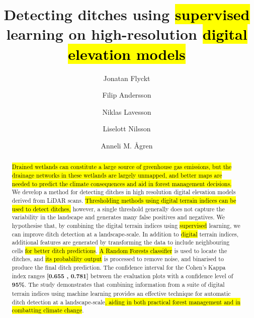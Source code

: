 \documentclass[11pt, review]{elsarticle} %
\begin{document}
\begin{frontmatter}
\title{Detecting ditches using \hl{supervised} learning on high-resolution \hl{digital elevation models}}

\author[ju]{Jonatan Flyckt}

\author[ju]{Filip Andersson}

\author[ju]{Niklas Lavesson}

\author[fa]{Liselott Nilsson}

\author[slu]{Anneli M. \AA gren}

\address[ju]{J\"onk\"oping Artificial Intelligence Laboratory, J\"onk\"oping University, Gjuterigatan 5, 551 11, J\"onk\"oping, Sweden}
\address[fa]{Forest Department, Swedish Forest Agency, Skeppargatan 17, 931 32 Skellefte\aa, Sweden}
\address[slu]{Department of Forest Ecology and Management, Swedish University of Agricultural Sciences, SLU, Skogsmarksgr\"and 17, 901 83, Ume\aa, Sweden}

\begin{abstract}
{\footnotesize
\hl{Drained wetlands can constitute a large source of greenhouse gas emissions, but the drainage networks in these wetlands are largely unmapped, and better maps are needed to predict the climate consequences and aid in forest management decisions.} We develop a method for detecting ditches in high resolution digital elevation models derived from LiDAR scans. \hl{Thresholding methods using digital terrain indices can be used to detect ditches,} however, a single threshold generally does not capture the variability in the landscape and generates many false positives and negatives. We hypothesise that, by combining the digital terrain indices using \hl{supervised} learning, we can improve ditch detection at a landscape-scale. In addition to \hl{digital} terrain indices, additional features are generated by transforming the data to include neighbouring cells \hl{for better ditch predictions}. \hl{A Random Forests classifier} is used to locate the ditches, and \hl{its probability output} is processed to remove noise, and binarised to produce the final ditch prediction. The confidence interval for the Cohen's Kappa index ranges \textbf{[0.655 , 0.781]} between the evaluation plots with a confidence level of \textbf{95\%}. The study demonstrates that combining information from  a suite of digital terrain indices using machine learning provides an effective technique for automatic ditch detection at a landscape-scale\hl{, aiding in both practical forest management and in combatting climate change}.}
\end{abstract}


\end{frontmatter}
\end{document}
